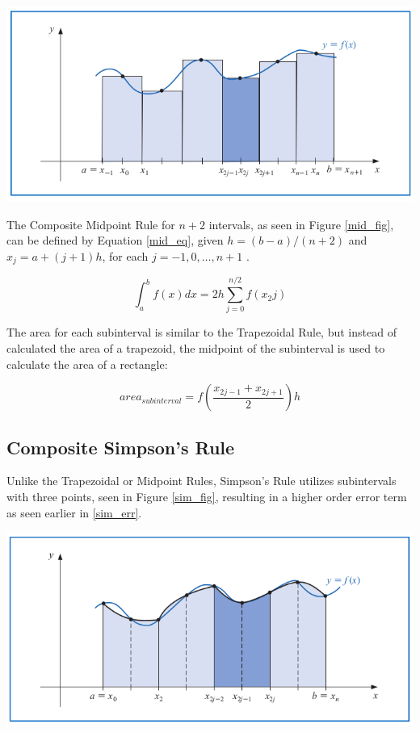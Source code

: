 \documentclass[a4paper]{article}
\begin{document}
\begin{center}
	\includegraphics[width=1\textwidth]{../additional/midpoint_fig.png}
	\label{mid_fig}
\end{center}

The Composite Midpoint Rule for $n+2$ intervals, as seen in Figure \ref{mid_fig}, can be defined by Equation \ref{mid_eq}, given $h=(b-a)/(n+2)$ and $x_j=a+(j+1)h$, for each $j=-1,0,\dots,n+1$ \citep{burden2010}.

\begin{equation}
\int_{a}^b f(x) dx = 2h \sum_{j=0}^{n/2}f(x_2j)
\label{mid_eq}
\end{equation}

The area for each subinterval is similar to the Trapezoidal Rule, but instead of calculated the area of a trapezoid, the midpoint of the subinterval is used to calculate the area of a rectangle:

\begin{equation}
area_{subinterval} = f(\frac{x_{2j-1}+x_{2j+1}}{2})h
\end{equation}

\subsection{Composite Simpson's Rule}
\label{method:simpsons}

Unlike the Trapezoidal or Midpoint Rules, Simpson's Rule utilizes subintervals with three points, seen in Figure \ref{sim_fig}, resulting in a higher order error term as seen earlier in \ref{sim_err}.

\begin{center}
	\includegraphics[width=1\textwidth]{../additional/simpsons_fig.png}
	\label{sim_fig}
\end{center}
\end{document}

